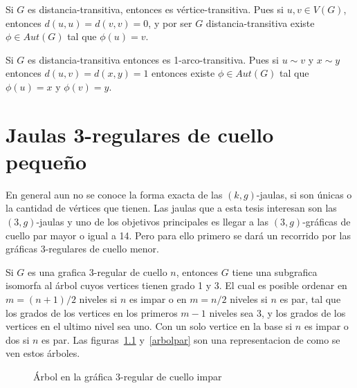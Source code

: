 \documentclass[12pt]{book}
\theoremstyle{definition}
\begin{document}
Si $G$ es distancia-transitiva, entonces es
vértice-transitiva. Pues si $u,v \in V(G)$, entonces
$d(u,u)=d(v,v)=0$, y por ser $G$ distancia-transitiva existe
$\phi\in Aut(G)$ tal que $\phi(u)=v$.

Si $G$ es distancia-transitiva entonces es
1-arco-transitiva. Pues si $u\sim v$ y $x\sim y$ entonces
$d(u,v)=d(x,y)=1$ entonces existe $\phi \in Aut(G)$ tal que
$\phi(u)=x$ y $\phi(v)=y$.

\chapter{Jaulas 3-regulares de cuello pequeño}

En general aun no se conoce la forma exacta de las $(k,g)$-jaulas, si
son únicas o la cantidad de vértices que tienen. Las jaulas que a esta
tesis interesan son las $(3,g)$-jaulas y uno de los objetivos
principales es llegar a las $(3,g)$-gráficas de cuello par mayor o
igual a 14. Pero para ello primero se dará un recorrido por las
gráficas $3$-regulares de cuello menor. 


Si $G$ es una grafica 3-regular de cuello $n$, entonces $G$ tiene
una subgrafica isomorfa al árbol cuyos vertices tienen grado 1 y 3. El
cual es posible ordenar en $m=(n + 1)/ 2$ niveles si $n$ es impar o en
$m=n/ 2$ niveles si $n$ es par, tal que los grados de los vertices
en los primeros $m-1$ niveles sea 3, y los grados de los vertices en
el ultimo nivel sea uno. Con un solo vertice en la base si $n$ es
impar o dos si $n$ es par. Las figuras~\ref{arbolimpar}
y~\ref{arbolpar} son una representacion de como se ven estos árboles.

\begin{figure}
    \centering
    \caption{Árbol en la gráfica 3-regular de cuello impar}\label{arbolimpar}
  \end{figure}
\end{document}
